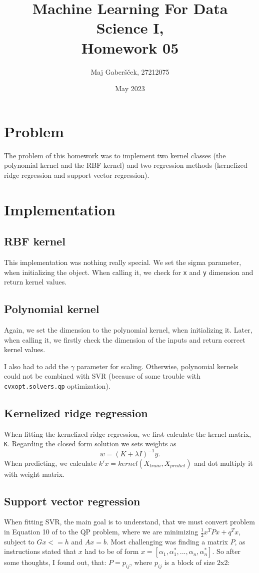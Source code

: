 \documentclass{article}
\title{Machine Learning For Data Science I, \\[0.1cm] Homework 05}
\author{Maj Gaberšček, 27212075}
\date{May 2023}
\begin{document}
\maketitle

\section{Problem}

The problem of this homework was to implement two kernel classes (the polynomial kernel and the RBF kernel) and two regression methods (kernelized ridge regression and support vector regression). 

\section{Implementation}

\subsection{RBF kernel}
This implementation was nothing really special. We set the sigma parameter, when initializing the object. When calling it, we check for \texttt{x} and \texttt{y} dimension and return kernel values.

\subsection{Polynomial kernel}
Again, we set the dimension to the polynomial kernel, when initializing it. Later, when calling it, we firstly check the dimension of the inputs and return correct kernel values.

I also had to add the $\gamma$ parameter for scaling. Otherwise, polynomial kernels could not be combined with SVR (because of some trouble with \texttt{cvxopt.solvers.qp} optimization).

\subsection{Kernelized ridge regression}
When fitting the kernelized ridge regression, we first calculate the kernel matrix, \texttt{K}. Regarding the closed form solution we sets weights as $$w = (K + \lambda I)^{-1} y.$$ When predicting, we calculate $k'x = kernel(X_{train}, X_{predict})$ and dot multiply it with weight matrix.

\subsection{Support vector regression}
When fitting SVR, the main goal is to understand, that we must convert problem in Equation 10 of \cite{smola2004tutorial} to the QP problem, where we are minimizing $\frac{1}{2} x^T P x + q^T x$, subject to $G x <= h$ and $A x = b$. Most challenging was finding a matrix $P$, as instructions stated that $x$ had to be of form $x = [\alpha_1, \alpha_1^*,..., \alpha_n, \alpha_n^*]$. So after some thoughts, I found out, that: $P = p_{ij}$, where $p_{ij}$ is a block of size 2x2: 
\end{document}
